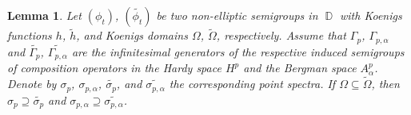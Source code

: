 \documentclass[11pt]{amsart}
\numberwithin{equation}{section}
\newtheorem{lemma}[theorem]{Lemma}
\theoremstyle{definition}
\DeclareMathOperator{\D}{\mathbb{D}}
\begin{document}
	\begin{lemma}\label{lem:bergman spectrum monotonicity}
		Let $(\phi_t)$, $(\widetilde{\phi_t})$ be two non-elliptic semigroups in $\D$ with Koenigs functions $h$, $\widetilde{h}$, and Koenigs domains $\Omega$, $\widetilde{\Omega}$, respectively. Assume that $\Gamma_p$, $\Gamma_{p,\alpha}$ and $\widetilde{\Gamma_p}$, $\widetilde{\Gamma_{p,\alpha}}$ are the infinitesimal generators of the respective induced semigroups of composition operators in the Hardy space $H^p$ and the Bergman space $A_\alpha^p$. Denote by $\sigma_p$, $\sigma_{p,\alpha}$, $\widetilde{\sigma_p}$, and $\widetilde{\sigma_{p,\alpha}}$ the corresponding point spectra. If $\Omega\subseteq\widetilde{\Omega}$, then $\sigma_p\supseteq\widetilde{\sigma_p}$ and $\sigma_{p,\alpha}\supseteq\widetilde{\sigma_{p,\alpha}}$.
	\end{lemma}
\end{document}
